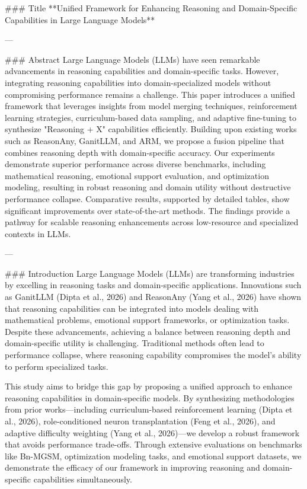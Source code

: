 ### Title  
**Unified Framework for Enhancing Reasoning and Domain-Specific Capabilities in Large Language Models**

---

### Abstract  
Large Language Models (LLMs) have seen remarkable advancements in reasoning capabilities and domain-specific tasks. However, integrating reasoning capabilities into domain-specialized models without compromising performance remains a challenge. This paper introduces a unified framework that leverages insights from model merging techniques, reinforcement learning strategies, curriculum-based data sampling, and adaptive fine-tuning to synthesize "Reasoning + X" capabilities efficiently. Building upon existing works such as ReasonAny, GanitLLM, and ARM, we propose a fusion pipeline that combines reasoning depth with domain-specific accuracy. Our experiments demonstrate superior performance across diverse benchmarks, including mathematical reasoning, emotional support evaluation, and optimization modeling, resulting in robust reasoning and domain utility without destructive performance collapse. Comparative results, supported by detailed tables, show significant improvements over state-of-the-art methods. The findings provide a pathway for scalable reasoning enhancements across low-resource and specialized contexts in LLMs.

---

### Introduction  
Large Language Models (LLMs) are transforming industries by excelling in reasoning tasks and domain-specific applications. Innovations such as GanitLLM (Dipta et al., 2026) and ReasonAny (Yang et al., 2026) have shown that reasoning capabilities can be integrated into models dealing with mathematical problems, emotional support frameworks, or optimization tasks. Despite these advancements, achieving a balance between reasoning depth and domain-specific utility is challenging. Traditional methods often lead to performance collapse, where reasoning capability compromises the model's ability to perform specialized tasks.

This study aims to bridge this gap by proposing a unified approach to enhance reasoning capabilities in domain-specific models. By synthesizing methodologies from prior works—including curriculum-based reinforcement learning (Dipta et al., 2026), role-conditioned neuron transplantation (Feng et al., 2026), and adaptive difficulty weighting (Yang et al., 2026)—we develop a robust framework that avoids performance trade-offs. Through extensive evaluations on benchmarks like Bn-MGSM, optimization modeling tasks, and emotional support datasets, we demonstrate the efficacy of our framework in improving reasoning and domain-specific capabilities simultaneously.

